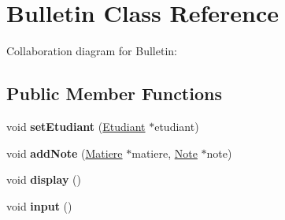 \hypertarget{class_bulletin}{\section{Bulletin Class Reference}
\label{class_bulletin}
}


Collaboration diagram for Bulletin\-:
\subsection*{Public Member Functions}
\begin{DoxyCompactItemize}
\item 
\hypertarget{class_bulletin_a10539f39753457a8ca3bee2b956a5dda}{void {\bfseries set\-Etudiant} (\hyperlink{class_etudiant}{Etudiant} $\ast$etudiant)}\label{class_bulletin_a10539f39753457a8ca3bee2b956a5dda}

\item 
\hypertarget{class_bulletin_a2f08b24708ef6e11c7d00ba17e602533}{void {\bfseries add\-Note} (\hyperlink{class_matiere}{Matiere} $\ast$matiere, \hyperlink{class_note}{Note} $\ast$note)}\label{class_bulletin_a2f08b24708ef6e11c7d00ba17e602533}

\item 
\hypertarget{class_bulletin_a9c98ddfef1e472439bccf90a68431527}{void {\bfseries display} ()}\label{class_bulletin_a9c98ddfef1e472439bccf90a68431527}

\item 
\hypertarget{class_bulletin_aa417e7a45dd7f6d216e97d516345feaf}{void {\bfseries input} ()}\label{class_bulletin_aa417e7a45dd7f6d216e97d516345feaf}

\end{DoxyCompactItemize}
